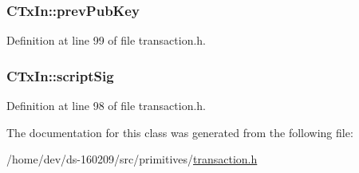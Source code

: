 \subsubsection[{prev\+Pub\+Key}]{ C\+Tx\+In\+::prev\+Pub\+Key}\label{class_c_tx_in_a91732c5ffb13520a6989b162ff6683fc}


Definition at line 99 of file transaction.\+h.

\hypertarget{class_c_tx_in_aba540fd902366210a6ad6cd9a18fe763}{}
\subsubsection[{script\+Sig}]{ C\+Tx\+In\+::script\+Sig}\label{class_c_tx_in_aba540fd902366210a6ad6cd9a18fe763}


Definition at line 98 of file transaction.\+h.



The documentation for this class was generated from the following file\+:\begin{DoxyCompactItemize}
\item 
/home/dev/ds-\/160209/src/primitives/\hyperlink{transaction_8h}{transaction.\+h}\end{DoxyCompactItemize}
